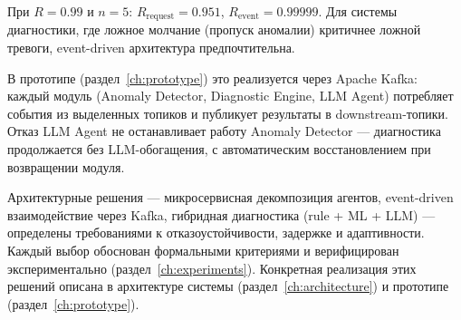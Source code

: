 При $R = 0.99$ и $n = 5$: $R_{\text{request}} = 0.951$, $R_{\text{event}} = 0.99999$. Для системы диагностики, где ложное молчание (пропуск аномалии) критичнее ложной тревоги, event-driven архитектура предпочтительна.

В прототипе (раздел~\ref{ch:prototype}) это реализуется через Apache Kafka: каждый модуль (Anomaly Detector, Diagnostic Engine, LLM Agent) потребляет события из выделенных топиков и публикует результаты в downstream-топики. Отказ LLM Agent не останавливает работу Anomaly Detector --- диагностика продолжается без LLM-обогащения, с автоматическим восстановлением при возвращении модуля.

\medskip

Архитектурные решения --- микросервисная декомпозиция агентов, event-driven взаимодействие через Kafka, гибридная диагностика (rule + ML + LLM) --- определены требованиями к отказоустойчивости, задержке и адаптивности. Каждый выбор обоснован формальными критериями и верифицирован экспериментально (раздел~\ref{ch:experiments}). Конкретная реализация этих решений описана в архитектуре системы (раздел~\ref{ch:architecture}) и прототипе (раздел~\ref{ch:prototype}).
